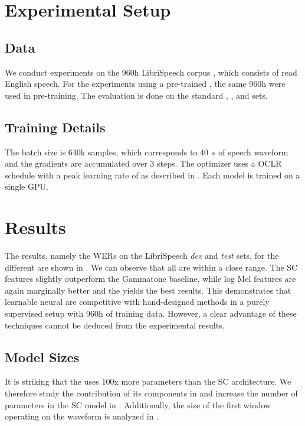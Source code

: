 \documentclass{INTERSPEECH2023}
\begin{document}
\section{Experimental Setup}
\subsection{Data}
We conduct experiments on the 960h LibriSpeech corpus \cite{panayotov2015librispeech}, which consists of read English speech.
For the experiments using a pre-trained \wvtwo \fe, the same 960h were used in pre-training.
The evaluation is done on the standard \devclean, \devother, \testclean and \testother sets.

\subsection{Training Details}
The batch size is 640k samples, which corresponds to \SI{40}{\second} of speech waveform and the gradients are accumulated over 3 steps.
The  optimizer uses a \gls{OCLR} schedule with a peak learning rate of  as described in .
Each model is trained on a single \gls{GPU}.

\section{Results}
The results, namely the \glspl{WER} on the LibriSpeech \textit{dev} and \textit{test} sets, for the different \fes are shown in .
We can observe that all are within a close range.
The \gls{SC} features slightly outperform the Gammatone baseline, while log Mel features are again marginally better and the \wvtwo \fe yields the best results.
This demonstrates that learnable neural \fes are competitive with hand-designed methods in a purely supervised setup with 960h of training data.
However, a clear advantage of these techniques cannot be deduced from the experimental results.


\subsection{Model Sizes}
It is striking that the  \fe uses 100x more parameters than the \gls{SC} architecture.
We therefore study the contribution of its components in  and increase the number of parameters in the \gls{SC} model in .
Additionally, the size of the first window operating on the waveform is analyzed in .
\end{document}
